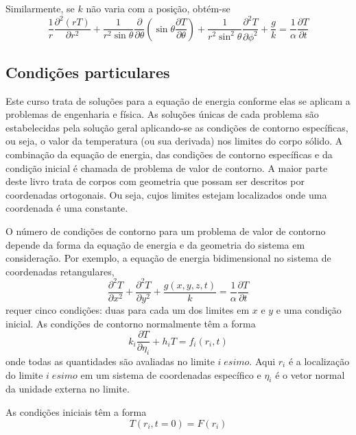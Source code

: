 Similarmente, se $k$ não varia com a posição, obtém-se
\begin{equation}\label{eq3Desfb}
	\frac{1}{r} \frac{\partial^2\left(rT\right)}{\partial r^2} +
	\frac{1}{r^2\sin\theta} \frac{\partial}{\partial\theta}
	\left(\sin\theta\frac{\partial T}{\partial\theta}\right) + 
	\frac{1}{r^2\sin^2\theta}\frac{\partial^2 T}{\partial\phi^2} + 
	\frac{g}{k} = \frac{1}{\alpha}\frac{\partial T}{\partial t}  
\end{equation}
	
\subsection{Condições particulares}
Este curso trata de soluções para a equação de energia conforme elas se aplicam a problemas de engenharia e física. As soluções únicas de cada problema  são estabelecidas pela solução geral aplicando-se as condições de contorno específicas, ou seja, o valor da temperatura (ou sua derivada) nos limites do corpo sólido. A combinação da equação de energia, das condições de contorno específicas e da condição inicial é chamada de problema de valor de contorno. A maior parte deste livro trata de corpos com geometria que possam ser descritos por coordenadas ortogonais. Ou seja, cujos limites estejam localizados onde uma coordenada é uma constante.
	
O número de condições de contorno para um problema de valor de contorno depende da forma da equação de energia e da geometria do sistema em consideração. Por exemplo, a equação de energia bidimensional no sistema de coordenadas retangulares,
\begin{equation}\label{eq2D}
	\frac{\partial ^2T}{\partial x^2} +
	\frac{\partial ^2T}{\partial y^2} + 
	\frac{g(x,y,z,t)}{k} = \frac{1}{\alpha} \frac{\partial T}{\partial t}  
\end{equation}
requer cinco condições: duas para cada um dos limites em $x$ e $y$ e uma condição inicial. As condições de contorno normalmente têm a forma	
\begin{equation}
		k_i \frac{ \partial T} {\partial \eta_i}  +h_i T =  f_i (r_i,t)   
\end{equation}
onde todas as quantidades são avaliadas no limite $i \; esimo$. Aqui $r_i$ é a localização do limite $i \; esimo $ em um sistema de coordenadas específico e $\eta_i$ é o vetor normal da unidade externa no limite. 

As condições iniciais têm a forma
\begin{equation}
	T(r_i, t=0) = F(r_i)   
\end{equation}

